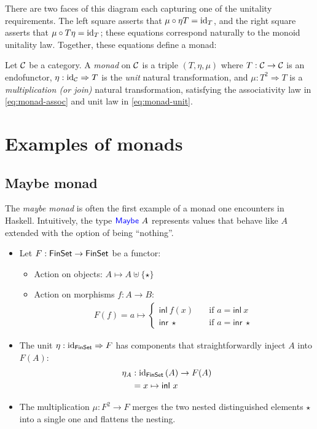 There are two faces of this diagram each capturing one of the unitality 
requirements. The left square asserts that $\mu \circ \eta T = \operatorname{id}_T$,
and the right square asserts that $\mu \circ T \eta = \operatorname{id}_T$; these 
equations correspond naturally to the monoid unitality law.
Together, these equations define a monad:

\begin{definition}[Monad]
    \sloppy
    Let $\mathcal C$ be a category. A \emph{monad} on $\mathcal C$ 
    is a triple $(T, \eta, \mu)$ where 
$T :
\mathcal C \to \mathcal C$ is an endofunctor,  $\eta : \operatorname{id}_\mathcal C \Rightarrow T$
is the \emph{unit} natural transformation,
and  $\mu : T^2 \Rightarrow T$
is a \emph{multiplication (or join)} natural transformation,
satisfying the associativity law in \cref{eq:monad-assoc}
and unit law in \cref{eq:monad-unit}.
\end{definition}


\section{Examples of monads}


\subsection{Maybe monad}
The \emph{maybe monad} is often the first example of a monad one 
encounters in Haskell.
Intuitively, the type $\mathsf{{\color{blue}Maybe}}~A$ represents values that 
behave like $A$ extended with the option of being ``nothing''.

\begin{itemize}
    \item Let $F : \mathsf{FinSet} \to \mathsf{FinSet}$ be a functor:
    \begin{itemize}
        \item Action on objects: $A \mapsto A \uplus \{\star\}$
        \item Action on morphisms $ f : A \to B$: 
        \begin{align*}
            F(f) = a \mapsto \begin{cases}
                \mathsf{inl}~f(x) \quad& \text{if } a = \mathsf{inl}~x \\ 
                \mathsf{inr}~\star \quad& \text{if } a = \mathsf{inr}~\star
            \end{cases}
        \end{align*}
    \end{itemize}
    \item The unit $\eta : \operatorname{id}_{\mathsf{FinSet}} \Rightarrow F$ has components 
    that straightforwardly inject $A$ into $F(A)$:
    \begin{align*}
        \eta_A &: \operatorname{id}_{\mathsf{FinSet}}{} (A) \to F(A) \\
        &= x \mapsto \mathsf{inl}~x
    \end{align*}
    \item The multiplication $\mu : F^2 \rightarrow F$ merges the two 
    nested distinguished elements $\star$ into a single one and 
    flattens the nesting. 
\end{itemize}

